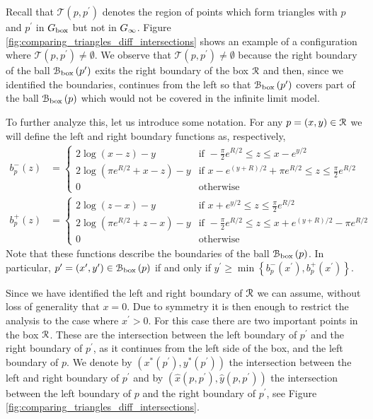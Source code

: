 Recall that $\mathcal{T}(p,p^\prime)$ denotes the region of points which form triangles with $p$ and $p^\prime$ in $G_{\mathrm{box}}$ but not in $G_{\infty}$. Figure \ref{fig:comparing_triangles_diff_intersections} shows an example of a configuration where $\mathcal{T}(p,p^\prime) \ne \emptyset$. We observe that $\mathcal{T}(p,p^\prime) \ne \emptyset$ because the right boundary of the ball ${\mathcal B}_{\text{box}}\left(p^\prime\right)$ exits the right boundary of the box ${\mathcal R}$ and then, since we identified the boundaries, continues from the left so that ${\mathcal B}_{\text{box}}\left(p^\prime\right)$ covers part of the ball ${\mathcal B}_{\text{box}}\left(p\right)$ which would not be covered in the infinite limit model. 

To further analyze this, let us introduce some notation. For any $p = (x,y) \in {\mathcal R}$ we will define the left and right boundary functions as, respectively,
\begin{align}
	b_p^-(z) &= \begin{cases}
		2 \log\left(x-z\right) - y &\mbox{if }  -\frac{\pi}{2} e^{R/2} \le z \le x - e^{y/2}  \\
		2\log\left(\pi e^{R/2} + x - z\right) - y 
			&\mbox{if } x - e^{(y + R)/2} + \pi e^{R/2} \le z \le \frac{\pi}{2} e^{R/2}\\
		0 &\mbox{otherwise}
	\end{cases}\\
	b_p^+(z) &= \begin{cases}
		2 \log\left(z-x\right) - y &\mbox{if } x + e^{y/2} \le z \le \frac{\pi}{2} e^{R/2} \\
		2\log\left(\pi e^{R/2} + z - x\right) - y 
			&\mbox{if } -\frac{\pi}{2} e^{R/2} \le z \le x + e^{(y + R)/2} - \pi e^{R/2}\\
		0 &\mbox{otherwise}
	\end{cases}
\end{align}
Note that these functions describe the boundaries of the ball ${\mathcal B}_{\text{box}}\left(p\right)$. In particular, $p^\prime = (x^\prime, y^\prime) \in {\mathcal B}_{\text{box}}\left(p\right)$ if and only if $y^\prime \ge \min\left\{b_p^-(x^\prime), b_p^+(x^\prime)\right\}$.

Since we have identified the left and right boundary of ${\mathcal R}$ we can assume, without loss of generality that $x = 0$. Due to symmetry it is then enough to restrict the analysis to the case where $x^\prime > 0$. 
For this case there are two important points in the box ${\mathcal R}$. These are the intersection between the left boundary of $p^\prime$ and the right boundary of $p^\prime$, as it continues from the left side of the box, and the left boundary of $p$. We denote by $(x^\ast(p^\prime), y^\ast(p^\prime))$ the intersection between the left and right boundary of $p^\prime$ and by $(\hat{x}(p,p^\prime), \hat{y}(p,p^\prime))$ the intersection between the left boundary of $p$ and the right boundary of $p^\prime$, see Figure \ref{fig:comparing_triangles_diff_intersections}. 

